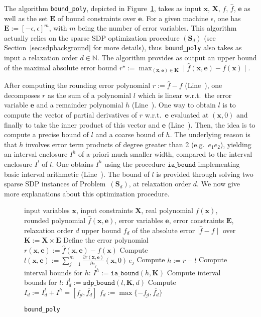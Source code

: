 \documentclass[preprint]{sigplanconf}
\newcommand{\code}[1]{\lstinline{#1}}
\newcommand{\N}{\mathbb{N}}
\newcommand{\x}{\mathbf{x}}
\newcommand{\e}{\mathbf{e}}
\def\S{\mathbf{S}}
\def\E{\mathbf{E}}
\def\K{\mathbf{K}}
\def\S{\mathbf{S}}
\def\X{\mathbf{X}}
\newcommand{\iaboundfun}[2]{\mathtt{ia\_bound}(#1, #2)}
\newcommand{\sdpboundfun}[3]{\mathtt{sdp\_bound}(#1, #2, #3)}
\newcommand{\iabound}{\mathtt{ia\_bound}}
\theoremstyle{plain}
\begin{document}
The algorithm \code{bound_poly}, depicted in Figure~\ref{alg:bound_poly}, takes as input $\x$, $\X$, $f$, $\hat{f}$, $\e$ as well as the set $\E$ of bound constraints over $\e$. For a given machine $\epsilon$, one has $\E := [-\epsilon, \epsilon]^m$, with $m$ being the number of error variables. This algorithm actually relies on the sparse SDP optimization procedure $(\S_d)$ (see Section~\ref{sec:sdpbackground} for more details), thus~\code{bound_poly} also takes as input a relaxation order $d \in \N$. The algorithm provides as output an upper bound of the maximal absolute error bound $r^\star := \max_{(\x,\e)\in \K} \mid \hat{f}(\x,\e) - f(\x) \mid $.

After computing the rounding error polynomial $r := \hat{f} - f$ (Line~), one decomposes $r$ as the sum of a polynomial $l$ which is linear w.r.t.~the error variable $\e$ and a remainder polynomial $h$ (Line~). One way to obtain $l$ is to compute the vector of partial derivatives of $r$ w.r.t.~$\e$ evaluated at $(\x, 0)$ and finally to take the inner product of this vector and $\e$ (Line~). Then, the idea is to compute a precise bound of $l$ and a coarse bound of $h$. The underlying reason is that $h$ involves error term products of degree greater than 2 (e.g.~$e_1 e_2$), yielding an interval enclosure $I^h$ of a-priori much smaller width, compared to the interval enclosure $I^l$ of $l$. One obtains $I^h$ using the procedure $\iabound$ implementing basic interval arithmetic (Line~). The bound of $l$ is provided through solving two sparse SDP instances of Problem~$(\S_d)$, at relaxation order $d$. We now give more explanations about this optimization procedure. 
%

\begin{figure}[!ht]
\begin{algorithmic}[1]                    
\Require input variables $\x$, input constraints $\X$, real polynomial $f(\x)$, rounded polynomial $\hat{f}(\x, \e)$, error variables $\e$, error constraints $\E$, relaxation order $d$
\Ensure upper bound $f_d$ of the absolute error $\mid \hat{f} - f  \mid$ over $\K := \X \times \E$
\State Define the error polynomial $r(\x, \e) := \hat{f}(\x,\e) - f(\x)$ \label{line:r}
\State Compute $l(\x,\e) := \sum_{j=1}^m \frac{\partial r(\x,\e)} {\partial e_j} (\x,0) \, e_j$ \label{line:l}
\State Compute $h := r - l$ \label{line:h}
\State Compute interval bounds for $h$: $I^h := \iaboundfun{h}{\K}$ \label{line:iabound}
\State Compute interval bounds for $l$: $I_d^l := \sdpboundfun{l}{\K}{d}$  \label{line:sdpbound}
\State Compute $I_d := I_d^l + I^h = [\underline{f_d}, \overline{f_d}]$ 
\State \Return $f_d := \max \{- \underline{f_d}, \overline{f_d} \}$
\end{algorithmic}
\caption{\code{bound_poly}}
\label{alg:bound_poly}
\end{figure}
%
\end{document}
